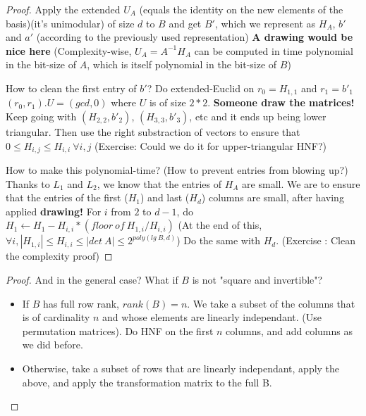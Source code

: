 \documentclass[11pt]{article}
\begin{document}
\begin{proof}
Apply the extended $U_A$ (equals the identity on the new elements of the basis)(it's unimodular) of size $d$ to $B$ and get $B'$, which we represent as $H_A$, $b'$ and $a'$ (according to the previously used representation) \textbf{A drawing would be nice here}
(Complexity-wise, $U_A = A^{-1} H_A$ can be computed in time polynomial in the bit-size of $A$, which is itself polynomial in the bit-size of $B$) \newline

How to clean the first entry of $b'$?
Do extended-Euclid on $r_0 = H_{1,1}$ and $r_1 = b'_1$
$(r_0,r_1).U = (gcd,0)$ where $U$ is of size $2*2$. 
\textbf{Someone draw the matrices!}
Keep going with $(H_{2,2},b'_2)$, $(H_{3,3},b'_3)$, etc and it ends up being lower triangular.
Then use the right substraction of vectors to ensure that $0 \leq H_{i,j} \leq H_{i,i} \ \forall i, j$
(Exercise: Could we do it for upper-triangular HNF?) \newline

How to make this polynomial-time? (How to prevent entries from blowing up?)
Thanks to $L_1$ and $L_2$, we know that the entries of $H_A$ are small.
We are to ensure that the entries of the first ($H_1$) and last ($H_d$) columns are small, after having applied \textbf{drawing!}
For $i$ from $2$ to $d-1$, do
$H_1 \leftarrow H_1 - H_{i,i}*(floor \ of \ H_{1,i}/H_{i,i})$ 
(At the end of this, $\forall i, |H_{1,i}| \leq H_{i,i} \leq |det \ A| \leq 2^{poly(lg \ B, d)}$)
Do the same with $H_d$.
(Exercise : Clean the complexity proof)
\end{proof}

\begin{proof}
And in the general case? What if $B$ is not "square and invertible"?

\begin{itemize}
\item If $B$ has full row rank, $rank(B)=n$. We take a subset of the columns that is of cardinality $n$ and whose elements are linearly independant. (Use permutation matrices). Do HNF on the first $n$ columns, and add columns as we did before.
\item Otherwise, take a subset of rows that are linearly independant, apply the above, and apply the transformation matrix to the full B. 
\end{itemize}
\end{proof}
\end{document}
